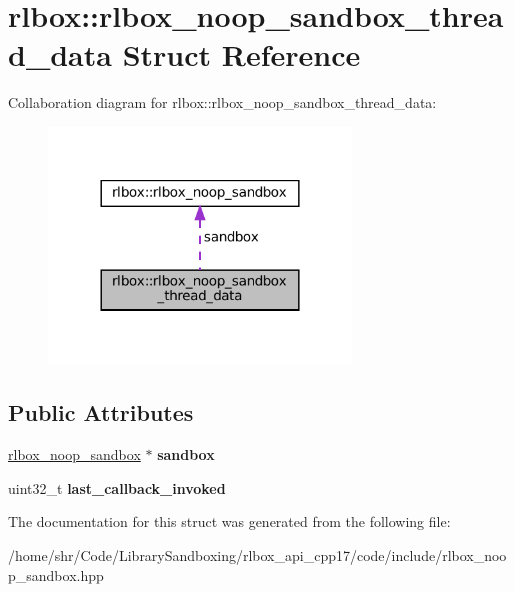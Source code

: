 \hypertarget{structrlbox_1_1rlbox__noop__sandbox__thread__data}{}\section{rlbox\+:\+:rlbox\+\_\+noop\+\_\+sandbox\+\_\+thread\+\_\+data Struct Reference}
\label{structrlbox_1_1rlbox__noop__sandbox__thread__data}


Collaboration diagram for rlbox\+:\+:rlbox\+\_\+noop\+\_\+sandbox\+\_\+thread\+\_\+data\+:\nopagebreak
\begin{figure}[H]
\begin{center}
\leavevmode
\includegraphics[width=228pt]{structrlbox_1_1rlbox__noop__sandbox__thread__data__coll__graph}
\end{center}
\end{figure}
\subsection*{Public Attributes}
\begin{DoxyCompactItemize}
\item 
\mbox{\label{structrlbox_1_1rlbox__noop__sandbox__thread__data_aa4022aa2e2b1433c9c98ad77ad47ac22}} 
\hyperlink{classrlbox_1_1rlbox__noop__sandbox}{rlbox\+\_\+noop\+\_\+sandbox} $\ast$ {\bfseries sandbox}
\item 
\mbox{\label{structrlbox_1_1rlbox__noop__sandbox__thread__data_aca401c5a2cd7e67ed305db3757f28d84}} 
uint32\+\_\+t {\bfseries last\+\_\+callback\+\_\+invoked}
\end{DoxyCompactItemize}


The documentation for this struct was generated from the following file\+:\begin{DoxyCompactItemize}
\item 
/home/shr/\+Code/\+Library\+Sandboxing/rlbox\+\_\+api\+\_\+cpp17/code/include/rlbox\+\_\+noop\+\_\+sandbox.\+hpp\end{DoxyCompactItemize}
